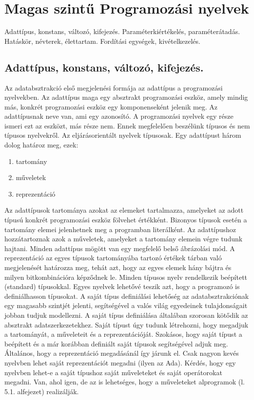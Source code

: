 \section{Magas szintű Programozási nyelvek}
{\footnotesize Adattípus, konstans, változó, kifejezés. Paraméterkiértékelés, paraméterátadás. Hatáskör, névterek, élettartam. Fordítási egységek, kivételkezelés.}
\subsection{Adattípus, konstans, változó, kifejezés.}
Az adatabsztrakció első megjelenési formája az adattípus a programozási nyelvekben. Az adattípus maga egy absztrakt programozási eszköz, amely mindig más, konkrét programozási eszköz egy komponenseként jelenik meg. Az adattípusnak neve van, ami egy azonosító. A programozási nyelvek
egy része ismeri ezt az eszközt, más része nem. Ennek megfelelően beszélünk típusos és nem típusos nyelvekről. Az eljárásorientált nyelvek típusosak. Egy adattípust három dolog határoz meg, ezek:
\begin{enumerate}[noitemsep]
	\item tartomány
	\item műveletek
	\item reprezentáció
\end{enumerate}
Az adattípusok tartománya azokat az elemeket tartalmazza, amelyeket az adott típusú konkrét programozási eszköz fölvehet értékként. Bizonyos típusok esetén a tartomány elemei jelenhetnek meg a programban literálként. Az adattípushoz hozzátartoznak azok a műveletek, amelyeket a tartomány elemein végre tudunk hajtani. Minden adattípus mögött van egy megfelelő belső ábrázolási mód. A reprezentáció az egyes típusok tartományába tartozó értékek tárban való megjelenését határozza meg, tehát azt, hogy az egyes elemek hány bájtra és milyen bitkombinációra képződnek le. Minden típusos nyelv rendelkezik beépített (standard) típusokkal. Egyes nyelvek lehetővé teszik azt, hogy a
programozó is definiálhasson típusokat. A saját típus definiálási lehetőség az adatabsztrakciónak egy magasabb szintjét jelenti, segítségével a valós világ egyedeinek tulajdonságait jobban tudjuk modellezni.
A saját típus definiálása általában szorosan kötődik az absztrakt adatszerkezetekhez. Saját típust úgy tudunk létrehozni, hogy megadjuk a tartományát, a műveleteit és a reprezentációját. Szokásos, hogy saját típust a beépített és a már korábban definiált saját típusok segítségével adjuk meg. Általános, hogy a reprezentáció megadásánál így járunk el. Csak nagyon kevés nyelvben lehet saját reprezentációt megadni (ilyen az Ada). Kérdés, hogy egy nyelvben lehet-e a saját típushoz saját műveleteket és saját operátorokat megadni. Van, ahol igen, de az is lehetséges, hogy a műveleteket alprogramok (l. 5.1. alfejezet) realizálják. %
